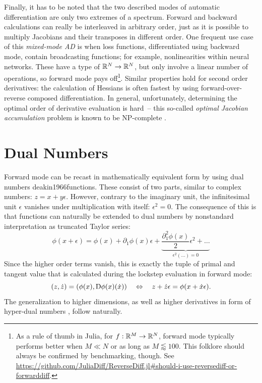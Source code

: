 Finally, it has to be noted that the two described modes of automatic differentiation are only two
extremes of a spectrum.  Forward and backward calculations can really be interleaved in arbitrary
order, just as it is possible to multiply Jacobians and their transposes in different order.  One
frequent use case of this \emph{mixed-mode AD} is when loss functions, differentiated using backward
mode, contain broadcasting functions; for example, nonlinearities within neural networks.  These
have a type of \(\mathbb{R}^N \to \mathbb{R}^N\), but only involve a linear number of operations, so forward mode
pays off\footnote{As a rule of thumb in Julia, for \(f: \mathbb{R}^M \to \mathbb{R}^N\), forward mode typically
  performs better when \(M \ll N\) or as long as \(M \lessapprox 100\).  This folklore should always
  be confirmed by benchmarking, though.  See
  \url{https://github.com/JuliaDiff/ReverseDiff.jl\#should-i-use-reversediff-or-forwarddiff}.}.
Similar properties hold for second order derivatives: the calculation of Hessians is often fastest
by using forward-over-reverse composed differentiation.  In general, unfortunately, determining the
optimal order of derivative evaluation is hard~-- this so-called \emph{optimal Jacobian
  accumulation} problem is known to be NP-complete \parencite{naumann2007optimal}.

\section{Dual Numbers}
\label{sec:dual-numbers}

Forward mode can be recast in mathematically equivalent form by using dual numbers
\parencite[see][section 3.1.1]{baydin2018automatic}{deakin1966functions}.  These consist of two
parts, similar to complex numbers: \(z = x + y\epsilon\).  However, contrary to the imaginary unit,
the infinitesimal unit \(\epsilon\) vanishes under multiplication with itself: \(\epsilon^2 = 0\).
The consequence of this is that functions can naturally be extended to dual numbers by nonstandard
interpretation as truncated Taylor series:
\begin{equation}
  \phi(x + \epsilon) = \phi(x) + \partial_1\phi(x)\epsilon + \underbrace{\frac{\partial^2_1\phi(x)}{2}\epsilon^2
  + \ldots}_{\epsilon^2 (\ldots) = 0}
\end{equation}
Since the higher order terms vanish, this is exactly the tuple of primal and tangent value that is
calculated during the lockstep evaluation in forward mode:
\begin{equation}
  (z, \dot{z}) = (\phi(x), \mathop{}\!\mathrm{D}\phi(x)(\dot{x})) \quad\Leftrightarrow\quad z + \dot{z}\epsilon = \phi(x + \dot{x}\epsilon).
\end{equation}
The generalization to higher dimensions, as well as higher derivatives in form of hyper-dual numbers
\parencite{fike2012automatic}, follow naturally.





